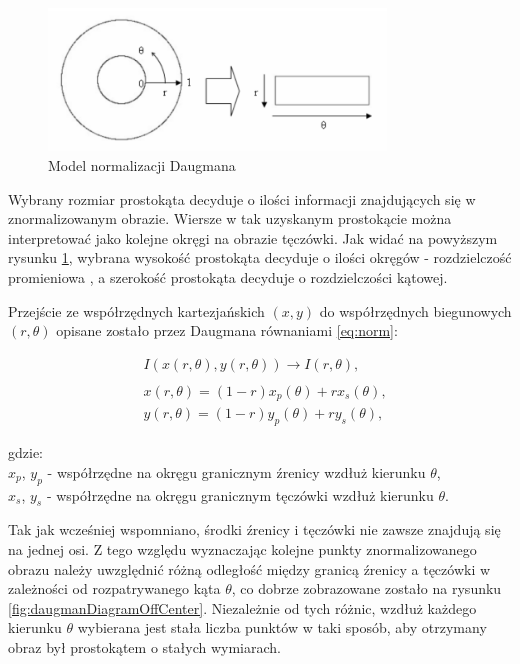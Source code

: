 \begin{figure}[ht]
  \includegraphics[width=0.8\textwidth]{images/normalization/schemaCenter.png}
  \centering
  \caption{Model normalizacji Daugmana \cite{masek}}
  \label{fig:daugmanDiagram}
\end{figure}

Wybrany rozmiar prostokąta decyduje o ilości informacji znajdujących się w znormalizowanym obrazie.
Wiersze w tak uzyskanym prostokącie można interpretowa\'c jako kolejne okręgi na obrazie tęczówki.
Jak wida\'c na powyższym rysunku \ref{fig:daugmanDiagram}, wybrana wysokoś\'c prostokąta decyduje
o ilości okręgów - rozdzielczoś\'c promieniowa , a szerokoś\'c prostokąta decyduje o rozdzielczości kątowej.\newline

Przejście ze współrzędnych kartezjańskich $(x,y)$ do współrzędnych biegunowych $(r,\theta)$ opisane zostało
przez Daugmana \cite{DaugmanHowIrisRecognitionWorks} równaniami \ref{eq:norm}:

\begin{equation}
  \begin{aligned}
    &I(x(r,\theta), y(r,\theta)) \rightarrow I(r,\theta),
    \\
    \\
    &x(r,\theta) = (1-r)x_{p}(\theta) + rx_{s}(\theta),
    \\
    &y(r,\theta) = (1-r)y_{p}(\theta) + ry_{s}(\theta),
  \end{aligned}
  \label{eq:norm}
\end{equation}

\noindent
gdzie:\\
\indent $x_{p}$, $y_{p}$ - współrzędne na okręgu granicznym \'zrenicy wzdłuż kierunku $\theta$,\\
\indent $x_{s}$, $y_{s}$ - współrzędne na okręgu granicznym tęczówki wzdłuż kierunku $\theta$.\newline

Tak jak wcześniej wspomniano, środki \'zrenicy i tęczówki nie zawsze znajdują się na jednej osi.
Z tego względu wyznaczając kolejne punkty znormalizowanego obrazu należy uwzględni\'c różną odległoś\'c
między granicą \'zrenicy a tęczówki w zależności od rozpatrywanego kąta $\theta$, co dobrze zobrazowane
zostało na rysunku \ref{fig:daugmanDiagramOffCenter}. Niezależnie od tych różnic, wzdłuż każdego kierunku
$\theta$ wybierana jest stała liczba punktów w taki sposób, aby otrzymany obraz był prostokątem
o stałych wymiarach.

